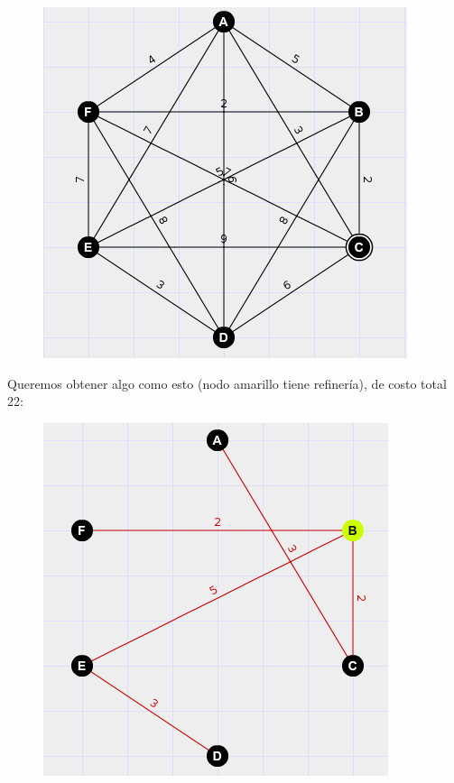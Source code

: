   \begin{figure}[h!]
   \begin{center}
 	\includegraphics[scale=0.7]{imagenes/ej3/cliqueBIEN.png}
   \end{center}
 \end{figure}
	
	Queremos obtener algo como esto (nodo amarillo tiene refiner\'ia), de costo total 22:
	
\newpage

  \begin{figure}[h!]
   \begin{center}
 	\includegraphics[scale=0.7]{imagenes/ej3/listoSIN.png}
   \end{center}
 \end{figure}

